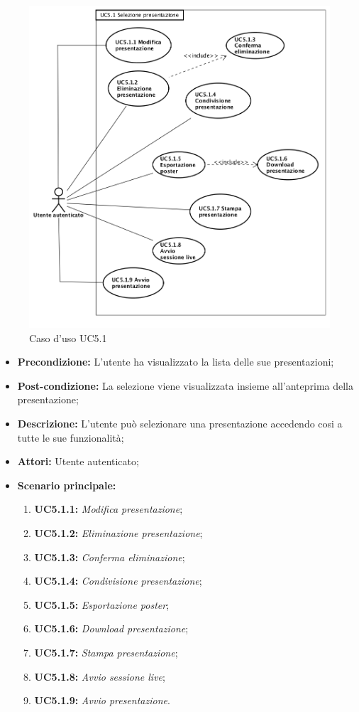 \begin{figure}[h]
	\begin{center}
	\includegraphics[scale=0.4]{diagram/UC5-1.png}
	\caption{Caso d'uso UC5.1}
	\end{center}
\end{figure}
\begin{itemize}
	\item \textbf{Precondizione:} L'utente ha visualizzato la lista delle sue presentazioni;
	\item \textbf{Post-condizione:} La selezione viene visualizzata insieme all'anteprima della presentazione;
	\item \textbf{Descrizione:} L'utente può selezionare una presentazione accedendo cosi a tutte le sue funzionalità;
	\item \textbf{Attori:} Utente autenticato;
	\item \textbf{Scenario principale:}
	\begin{enumerate}
		\item \textbf{ UC5.1.1:} \textit{ Modifica presentazione};
		\item \textbf{ UC5.1.2:} \textit{ Eliminazione presentazione};
		\item \textbf{ UC5.1.3:} \textit{ Conferma eliminazione};
		\item \textbf{ UC5.1.4:} \textit{ Condivisione presentazione};
		\item \textbf{ UC5.1.5:} \textit{ Esportazione poster};
		\item \textbf{ UC5.1.6:} \textit{ Download presentazione};
		\item \textbf{ UC5.1.7:} \textit{ Stampa presentazione};
		\item \textbf{ UC5.1.8:} \textit{ Avvio sessione live};
		\item \textbf{ UC5.1.9:} \textit{ Avvio presentazione}.
	\end{enumerate}
\end{itemize}
